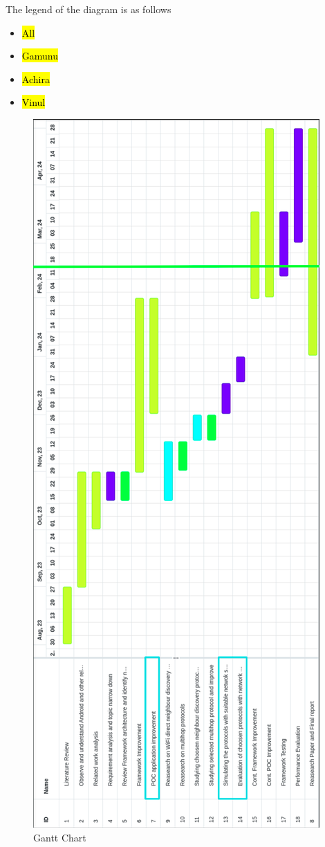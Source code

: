 \documentclass[12pt, conference, onecolumn, a4paper]{IEEEtran}
\begin{document}
The legend of the diagram is as follows
\begin{itemize}
    \item \hl{All}
    \item \hl{Gamunu}
    \item \hl{Achira}
    \item \hl{Vinul}
\end{itemize}

\begin{figure}[htbp]
    \centerline{\includegraphics[height=1.4\textwidth]{imgs/gantt.png}}
    \caption{Gantt Chart}
    \label{gantt}
\end{figure}

\newpage
\newpage
\end{document}
